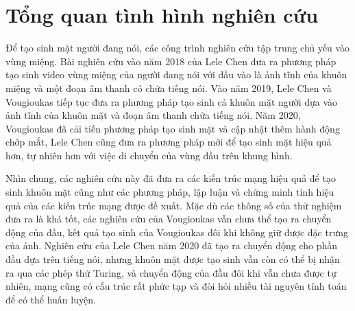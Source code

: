 \section{\texorpdfstring{Tổng quan tình hình nghiên cứu}{overview}}
Để tạo sinh mặt người đang nói, các công trình nghiên cứu tập trung chủ yếu vào vùng miệng. Bài nghiên cứu vào năm 2018 của Lele Chen \cite{chen2018} đưa ra phương pháp tạo sinh video vùng miệng của người đang nói với đầu vào là ảnh tĩnh của khuôn miệng và một đoạn âm thanh có chứa tiếng nói. Vào năm 2019, Lele Chen \cite{chen2019} và Vougioukas \cite{vougioukas2019} tiếp tục đưa ra phương pháp tạo sinh cả khuôn mặt người dựa vào ảnh tĩnh của khuôn mặt và đoạn âm thanh chứa tiếng nói. Năm 2020, Vougioukas \cite{vougioukas2020} đã cải tiến phương pháp tạo sinh mặt và cập nhật thêm hành động chớp mắt, Lele Chen \cite{chen2020} cũng đưa ra phương pháp mới để tạo sinh mặt hiệu quả hơn, tự nhiên hơn với việc di chuyển của vùng đầu trên khung hình.

Nhìn chung, các nghiên cứu này đã đưa ra các kiến trúc mạng hiệu quả để tạo sinh khuôn mặt cũng như các phương pháp, lập luận và chứng minh tính hiệu quả của các kiến trúc mạng được đề xuất. Mặc dù các thông số của thử nghiệm đưa ra là khá tốt, các nghiên cứu của Vougioukas vẫn chưa thể tạo ra chuyển động của đầu, kết quả tạo sinh của Vougioukas đôi khi không giữ được đặc trưng của ảnh. Nghiên cứu của Lele Chen năm 2020 \cite{chen2020} đã tạo ra chuyển động cho phần đầu dựa trên tiếng nói, nhưng khuôn mặt được tạo sinh vẫn còn có thể bị nhận ra qua các phép thử Turing, và chuyển động của đầu đôi khi vẫn chưa được tự nhiên, mạng cũng có cấu trúc rất phức tạp và đòi hỏi nhiều tài nguyên tính toán để có thể huấn luyện.
